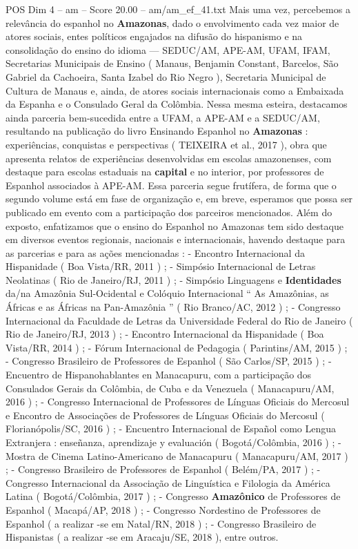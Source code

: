 \begin{textsample}{POS Dim 4 – am – Score 20.00 – am/am\_ef\_41.txt}
Mais uma vez, percebemos a relevância do espanhol no \textbf{Amazonas}, dado o envolvimento cada vez maior de atores sociais, entes políticos engajados na difusão do hispanismo e na consolidação do ensino do idioma — SEDUC/AM, APE-AM, UFAM, IFAM, Secretarias Municipais de Ensino ( Manaus, Benjamin Constant, Barcelos, São Gabriel da Cachoeira, Santa Izabel do Rio Negro ), Secretaria Municipal de Cultura de Manaus e, ainda, de atores sociais internacionais como a Embaixada da Espanha e o Consulado Geral da Colômbia.
Nessa mesma esteira, destacamos ainda parceria bem-sucedida entre a UFAM, a APE-AM e a SEDUC/AM, resultando na publicação do livro Ensinando Espanhol no \textbf{Amazonas} : experiências, conquistas e perspectivas ( TEIXEIRA et al., 2017 ), obra que apresenta relatos de experiências desenvolvidas em escolas amazonenses, com destaque para escolas estaduais na \textbf{capital} e no interior, por professores de Espanhol associados à APE-AM.
Essa parceria segue frutífera, de forma que o segundo volume está em fase de organização e, em breve, esperamos que possa ser publicado em evento com a participação dos parceiros mencionados.
Além do exposto, enfatizamos que o ensino do Espanhol no Amazonas tem sido destaque em diversos eventos regionais, nacionais e internacionais, havendo destaque para as parcerias e para as ações mencionadas : - Encontro Internacional da Hispanidade ( Boa Vista/RR, 2011 ) ; - Simpósio Internacional de Letras Neolatinas ( Rio de Janeiro/RJ, 2011 ) ; - Simpósio Linguagens e \textbf{Identidades} da/na Amazônia Sul-Ocidental e Colóquio Internacional “ As Amazônias, as Áfricas e as Áfricas na Pan-Amazônia ” ( Rio Branco/AC, 2012 ) ; - Congresso Internacional da Faculdade de Letras da Universidade Federal do Rio de Janeiro ( Rio de Janeiro/RJ, 2013 ) ; - Encontro Internacional da Hispanidade ( Boa Vista/RR, 2014 ) ; - Fórum Internacional de Pedagogia ( Parintins/AM, 2015 ) ; - Congresso Brasileiro de Professores de Espanhol ( São Carlos/SP, 2015 ) ; - Encuentro de Hispanohablantes en Manacapuru, com a participação dos Consulados Gerais da Colômbia, de Cuba e da Venezuela ( Manacapuru/AM, 2016 ) ; - Congresso Internacional de Professores de Línguas Oficiais do Mercosul e Encontro de Associações de Professores de Línguas Oficiais do Mercosul ( Florianópolis/SC, 2016 ) ; - Encuentro Internacional de Español como Lengua Extranjera : enseñanza, aprendizaje y evaluación ( Bogotá/Colômbia, 2016 ) ; - Mostra de Cinema Latino-Americano de Manacapuru ( Manacapuru/AM, 2017 ) ; - Congresso Brasileiro de Professores de Espanhol ( Belém/PA, 2017 ) ; - Congresso Internacional da Associação de Linguística e Filologia da América Latina ( Bogotá/Colômbia, 2017 ) ; - Congresso \textbf{Amazônico} de Professores de Espanhol ( Macapá/AP, 2018 ) ; - Congresso Nordestino de Professores de Espanhol ( a realizar -se em Natal/RN, 2018 ) ; - Congresso Brasileiro de Hispanistas ( a realizar -se em Aracaju/SE, 2018 ), entre outros.

\end{textsample}

